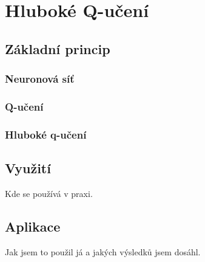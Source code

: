 \chapter{Hluboké Q-učení}

\section{Základní princip}
\subsection{Neuronová síť}

\subsection{Q-učení}
\subsection{Hluboké q-učení}

\section{Využití}
Kde se používá v praxi.


\section{Aplikace}
Jak jsem to použil já a jakých výsledků jsem dosáhl.


